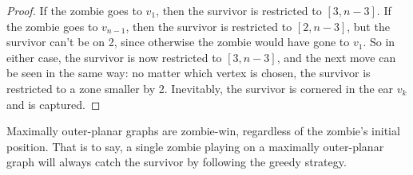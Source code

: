 \documentclass[letterpaper, 10pt]{article}
\begin{document}
\begin{proof}
  If the zombie goes to $v_1$, then the survivor is restricted to $[3, n-3]$.
  If the zombie goes to $v_{n-1}$, then the survivor is restricted to $[2, n-3]$,
  but the survivor can't be on 2, since otherwise the zombie would have gone to $v_1$.
  So in either case, the survivor is now restricted to $[3, n-3]$, and the next
  move can be seen in the same way: no matter which vertex is chosen, the
  survivor is restricted to a zone smaller by 2. Inevitably, the survivor is
  cornered in the ear $v_k$ and is captured.
\end{proof}

\begin{theorem}
Maximally outer-planar graphs are zombie-win, regardless of the zombie's initial position.
That is to say, a single zombie
playing on a maximally outer-planar graph will always catch the survivor by following
the greedy strategy.
\end{theorem}
\end{document}
